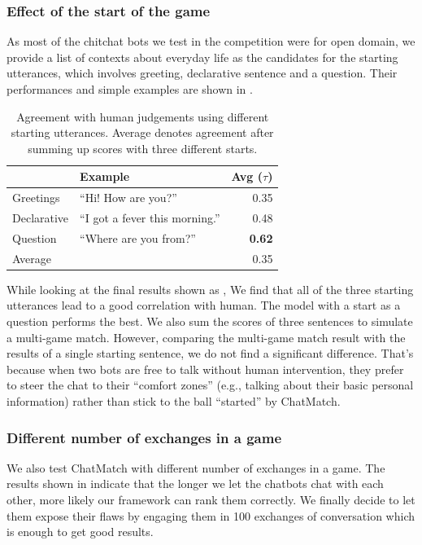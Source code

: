\subsubsection*{Effect of the start of the game}

As most of the chitchat bots we test in the competition 
were for open domain, we provide a list of contexts about 
everyday life as the candidates for the starting utterances, 
which involves greeting, declarative sentence and a question.  
Their performances and simple examples are shown 
in .

\begin{table}[th!]
\centering
\small
\begin{tabular}{llr}
\toprule
 & Example  & Avg ($\tau$)\\ \midrule
Greetings  & ``Hi! How are you?'' & 0.35  \\
Declarative  & ``I got a fever this morning.'' & 0.48  \\
Question  & ``Where are you from?'' & \textbf{ 0.62}  \\
Average  & & 0.35  \\
\bottomrule
\end{tabular}
\caption{
Agreement with human judgements using different starting utterances. 
Average denotes agreement after summing up scores with 
three different starts.}
\label{tab:multi-context}
\end{table}

 While looking at the final results shown as ,
 We find that all of the three starting utterances lead to a 
good correlation with human. The model with a start as a question 
performs the best. We also sum the scores of three sentences to 
simulate a multi-game match.  However, comparing the multi-game 
match result with the results of a single starting sentence, 
we do not find a significant difference. That's because when two 
bots are free to talk without human intervention, they prefer 
to steer the chat to their ``comfort zones'' (e.g., talking about 
their basic personal information) rather than stick to the ball 
``started'' by ChatMatch. 

\subsubsection*{Different number of exchanges in a game} 

We also test ChatMatch with different number of exchanges in a game. 
The results shown in  indicate that the 
longer we let the chatbots chat with each other, more likely our framework can rank them correctly. We finally decide to let them 
expose their flaws by engaging them in 100 exchanges 
of conversation which is enough to get good results. 

